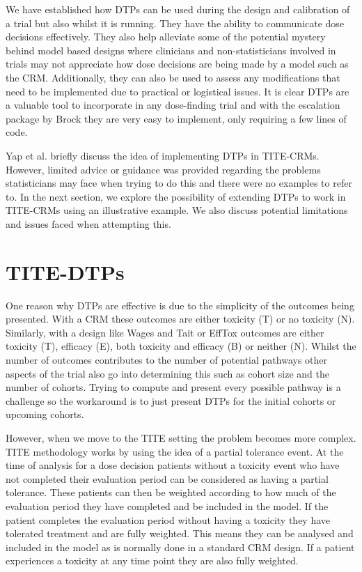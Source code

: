 We have established how DTPs can be used during the design and calibration of a trial but also whilst it is running. They have the ability to communicate dose decisions effectively. They also help alleviate some of the potential mystery behind model based designs where clinicians and non-statisticians involved in trials may not appreciate how dose decisions are being made by a model such as the CRM. Additionally, they can also be used to assess any modifications that need to be implemented due to practical or logistical issues. It is clear DTPs are a valuable tool to incorporate in any dose-finding trial and with the escalation package by Brock \cite{brockModularApproachDose2020} they are very easy to implement, only requiring a few lines of code. 

Yap et al. \cite{yapDoseTransitionPathways2017} briefly discuss the idea of implementing DTPs in TITE-CRMs. However, limited advice or guidance was provided regarding the problems statisticians may face when trying to do this and there were no examples to refer to. In the next section, we explore the possibility of extending DTPs to work in TITE-CRMs using an illustrative example. We also discuss potential limitations and issues faced when attempting this.   


\section{TITE-DTPs}
\label{tite-dtp:TITE-DTPs}

One reason why DTPs are effective is due to the simplicity of the outcomes being presented. With a CRM these outcomes are either toxicity (T) or no toxicity (N). Similarly, with a design like Wages and Tait or EffTox outcomes are either toxicity (T), efficacy (E), both toxicity and efficacy (B) or neither (N). Whilst the number of outcomes contributes to the number of potential pathways other aspects of the trial also go into determining this such as cohort size and the number of cohorts. Trying to compute and present every possible pathway is a challenge so the workaround is to just present DTPs for the initial cohorts or upcoming cohorts.  

However, when we move to the TITE setting the problem becomes more complex. TITE methodology works by using the idea of a partial tolerance event. At the time of analysis for a dose decision patients without a toxicity event who have not completed their evaluation period can be considered as having a partial tolerance. These patients can then be weighted according to how much of the evaluation period they have completed and be included in the model. If the patient completes the evaluation period without having a toxicity they have tolerated treatment and are fully weighted. This means they can be analysed and included in the model as is normally done in a standard CRM design. If a patient experiences a toxicity at any time point they are also fully weighted. 

